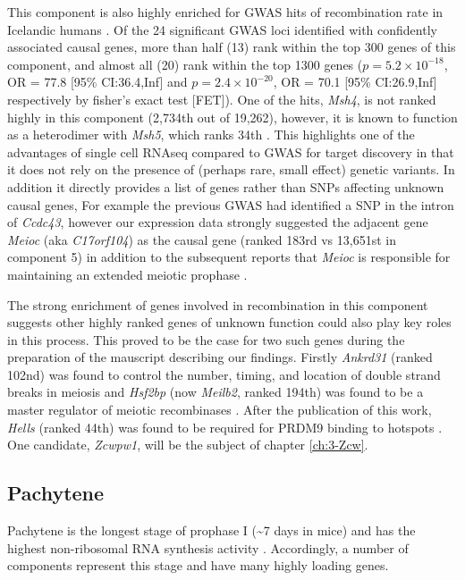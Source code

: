 This component is also highly enriched for GWAS hits of recombination rate in Icelandic humans \parencite{Halldorsson2019Characterizing}.
Of the 24 significant GWAS loci identified with confidently associated causal genes, more than half (13) rank within the top 300 genes of this component, and almost all (20) rank within the top 1300 genes ($p = 5.2\times10^{-18}$, OR = 77.8 [95\% CI:36.4,Inf] and $p = 2.4\times10^{-20}$, OR = 70.1 [95\% CI:26.9,Inf] respectively by fisher's exact test [FET]).
One of the hits, \textit{Msh4}, is not ranked highly in this component (2,734th out of 19,262), however, it is known to function as a heterodimer with \textit{Msh5}, which ranks 34th \parencite{Rakshambikai2013Structural}.
This highlights one of the advantages of single cell RNAseq compared to GWAS for target discovery in that it does not rely on the presence of (perhaps rare, small effect) genetic variants.
In addition it directly provides a list of genes rather than SNPs affecting unknown causal genes, For example the previous GWAS had identified a SNP in the intron of \textit{Ccdc43}, however our expression data strongly suggested the adjacent gene \textit{Meioc} (aka \textit{C17orf104}) as the causal gene (ranked 183rd vs 13,651st in component 5) in addition to the subsequent reports that \textit{Meioc} is responsible for maintaining an extended meiotic prophase \parencite{Abby2016Implementation, Kong2014Common, Soh2017Meioc}.

The strong enrichment of genes involved in recombination in this component suggests other highly ranked genes of unknown function could also play key roles in this process.
This proved to be the case for two such genes during the preparation of the mauscript describing our findings.
Firstly \textit{Ankrd31} (ranked 102nd) was found to control the number, timing, and location of double strand breaks in meiosis \parencite{Boekhout2018REC114, Papanikos2018ANKRD31} and \textit{Hsf2bp} (now \textit{Meilb2}, ranked 194th) was found to be a master regulator of meiotic recombinases \parencite{Zhang2019meiosisspecific}.
After the publication of this work, \textit{Hells} (ranked 44th) was found to be required for PRDM9 binding to hotspots \parencite{Spruce2019HELLS}.
One candidate, \textit{Zcwpw1}, will be the subject of chapter \ref{ch:3-Zcw}.


\subsection{Pachytene}

Pachytene is the longest stage of prophase I (\textasciitilde7 days in mice) and has the highest non-ribosomal RNA synthesis activity \parencite{Monesi1978Chapter}.
Accordingly, a number of components represent this stage and have many highly loading genes.


